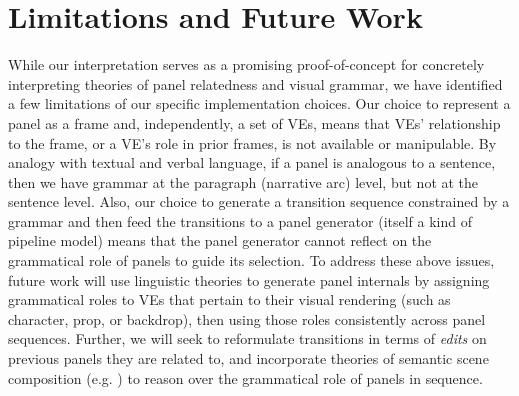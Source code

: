 \section{Limitations and Future Work}


While our interpretation serves as a promising proof-of-concept for
concretely interpreting theories of panel relatedness and visual grammar,
we have identified a few limitations of our specific implementation
choices.  Our choice to represent a panel as a frame and,
independently, a set of VEs, means that VEs' relationship to the frame, or
a VE's role in prior frames, is not available or manipulable.  By analogy
with textual and verbal language, if a panel is analogous to a sentence,
then we have grammar at the paragraph (narrative arc) level, but not at
the sentence level.  Also, our choice to generate a transition sequence
constrained by a grammar and {then} feed the transitions to a panel
generator (itself a kind of pipeline model) means that the panel generator
cannot reflect on the grammatical role of panels to guide its selection.
%
To address these above issues, future work will use linguistic theories to 
generate panel internals by assigning grammatical roles to VEs that 
pertain to their visual rendering (such as character, prop, or backdrop), 
then using those roles consistently across panel sequences. Further, we
will seek to reformulate transitions in terms of {\em edits} on previous 
panels they are related to, and incorporate theories of semantic scene 
composition (e.g. \cite{zitnick2013bringing}) to reason over the grammatical
role of panels in sequence.

%
%
%
%
%
%
%
%


